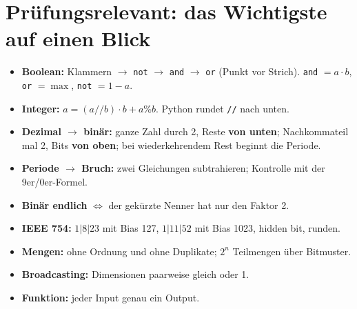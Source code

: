 \section{Prüfungsrelevant: das Wichtigste auf einen Blick}
\begin{pruefung}
  \begin{itemize}[nosep]
    \item \textbf{Boolean:} Klammern $\to$ \texttt{not} $\to$ \texttt{and} $\to$ \texttt{or}
          (Punkt vor Strich). \texttt{and} $= a \cdot b$, \texttt{or} $= \max$, \texttt{not} $= 1 - a$.
    \item \textbf{Integer:} $a = (a /\!/ b)\cdot b + a \% b$. Python rundet \texttt{//} nach unten.
    \item \textbf{Dezimal $\to$ binär:} ganze Zahl durch 2, Reste \textbf{von unten};
          Nachkommateil mal 2, Bits \textbf{von oben}; bei wiederkehrendem Rest beginnt die Periode.
    \item \textbf{Periode $\to$ Bruch:} zwei Gleichungen subtrahieren; Kontrolle mit der 9er/0er-Formel.
    \item \textbf{Binär endlich} $\iff$ der gekürzte Nenner hat nur den Faktor 2.
    \item \textbf{IEEE 754:} $1|8|23$ mit Bias 127, $1|11|52$ mit Bias 1023, hidden bit, runden.
    \item \textbf{Mengen:} ohne Ordnung und ohne Duplikate; $2^n$ Teilmengen über Bitmuster.
    \item \textbf{Broadcasting:} Dimensionen paarweise gleich oder 1.
    \item \textbf{Funktion:} jeder Input genau ein Output.
  \end{itemize}
\end{pruefung}

